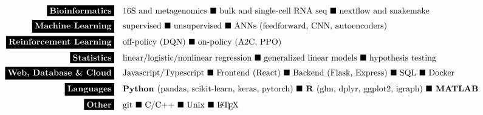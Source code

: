 \documentclass[10pt]{developercv} %
\begin{document}
%
%



\vspace{-4mm}
\begin{minipage}[t]{\textwidth}
	\vspace{-\baselineskip}
	\begin{align*}
    \colorbox{black}{\textcolor{white}{\textbf{Bioinformatics}}} &\quad \text{16S and metagenomics } \blacksquare \text{ bulk and single-cell RNA seq } \blacksquare \text{ nextflow and snakemake } \\
        \colorbox{black}{\textcolor{white}{\textbf{Machine Learning}}} &\quad \text{supervised } \blacksquare \text{ unsupervised } \blacksquare \text{ ANNs (feedforward, CNN, autoencoders) }  \\
        \colorbox{black}{\textcolor{white}{\textbf{Reinforcement Learning}}} &\quad \text{off-policy (DQN) } \blacksquare \text{ on-policy (A2C, PPO) } \\
        \colorbox{black}{\textcolor{white}{\textbf{Statistics}}} &\quad \text{linear/logistic/nonlinear regression } \blacksquare \text{ generalized linear models } \blacksquare \text{ hypothesis testing } \\
        \colorbox{black}{\textcolor{white}{\textbf{Web, Database \& Cloud}}} &\quad \text{Javascript/Typescript } \blacksquare \text{ Frontend (React) } \blacksquare \text{ Backend (Flask, Express) } \blacksquare \text{ SQL } \blacksquare \text{ Docker } \\
        \colorbox{black}{\textcolor{white}{\textbf{Languages}}} &\quad \textbf{Python }\text{(pandas, scikit-learn, keras, pytorch) } \blacksquare \textbf{ R }\text{(glm, dplyr, ggplot2, igraph) } \blacksquare \textbf{ MATLAB}\\
        \colorbox{black}{\textcolor{white}{\textbf{Other}}} &\quad \text{git }
        \blacksquare \text{ C/C++ }\blacksquare \text{ Unix } \blacksquare \text{ \LaTeX }
	\end{align*}
\end{minipage}
\end{document}
